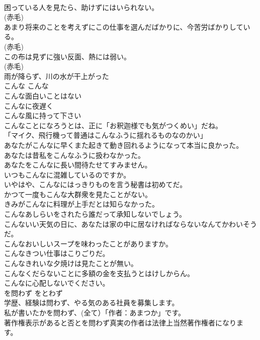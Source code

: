 \documentclass[8pt]{extreport}
\begin{document}
\begin{CJK}{UTF8}{min}
\\	困っている人を見たら、助けずにはいられない。  
\\	(赤毛)
\\	あまり将来のことを考えずにこの仕事を選んだばかりに、今苦労ばかりしている。  
\\	(赤毛)
\\	この布は見ずに強い反面、熱には弱い。  
\\	(赤毛)
\\	雨が降らず、川の水が干上がった  
\\	こんな	こんな	
\\	こんな面白いことはない  
\\	こんなに夜遅く  
\\	こんな風に持って下さい  
\\	こんなことになろうとは、正に「お釈迦様でも気がつくめい」だね。  
\\	「マイク、飛行機って普通はこんなふうに揺れるものなのかい」  
\\	あなたがこんなに早くまた起きて動き回れるようになって本当に良かった。  
\\	あなたは昔私をこんなふうに扱わなかった。  
\\	あなたをこんなに長い間待たせてすみません。  
\\	いつもこんなに混雑しているのですか。  
\\	いやはや、こんなにはっきりものを言う秘書は初めてだ。  
\\	かつて一度もこんな大群衆を見たことがない。  
\\	きみがこんなに料理が上手だとは知らなかった。  
\\	こんなあしらいをされたら誰だって承知しないでしょう。  
\\	こんないい天気の日に、あなたは家の中に居なければならないなんてかわいそうだ。  
\\	こんなおいしいスープを味わったことがありますか。  
\\	こんなきつい仕事はこりごりだ。  
\\	こんなきれいな夕焼けは見たことが無い｡  
\\	こんなくだらないことに多額の金を支払うとはけしからん。  
\\	こんなに心配しないでください。  
\\	を問わず	をとわず	
\\	学歴、経験は問わず、やる気のある社員を募集します。  
\\	私が書いたかを問わず、(全て）「作者：あまつか」です。  
\\	著作権表示があると否とを問わず真実の作者は法律上当然著作権者になります。  

\end{CJK}
\end{document}

